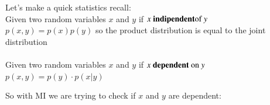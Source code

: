 \begin{tcolorbox}[colbacktitle=black!7!white,coltitle=black!75!white,title=\textbf{Statistics Recall}]
Let's make a quick statistics recall:\\
Given two random variables $x$ and $y$ if $x \text{ \textbf{indipendent}of } y$\\
$p(x,y) = p(x)p(y)$ so the product distribution is equal to the joint distribution\\\\
Given two random variables $x$ and $y$ if $x \text{ \textbf{dependent }on } y$\\
$p(x,y)=p(y)\cdot p(x|y)$
\end{tcolorbox}

So with MI we are trying to check if $x$ and $y$ are dependent:\\


